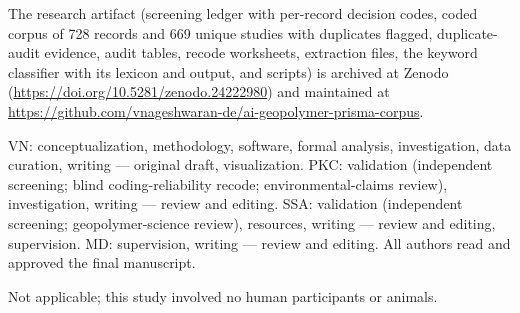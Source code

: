 \documentclass[pdflatex,sn-basic]{sn-jnl}
\begin{document}
The research artifact (screening ledger with per-record decision codes, coded corpus of 728 records and 669 unique studies with duplicates flagged, duplicate-audit evidence, audit tables, recode worksheets, extraction files, the keyword classifier with its lexicon and output, and scripts) is archived at Zenodo (\url{https://doi.org/10.5281/zenodo.24222980}) and maintained at \url{https://github.com/vnageshwaran-de/ai-geopolymer-prisma-corpus}.

VN: conceptualization, methodology, software, formal analysis, investigation, data curation, writing --- original draft, visualization. PKC: validation (independent screening; blind coding-reliability recode; environmental-claims review), investigation, writing --- review and editing. SSA: validation (independent screening; geopolymer-science review), resources, writing --- review and editing, supervision. MD: supervision, writing --- review and editing. All authors read and approved the final manuscript.

Not applicable; this study involved no human participants or animals.


\end{document}
